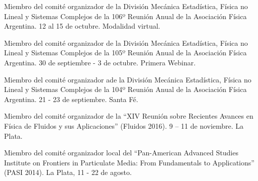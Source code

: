  Miembro del comité organizador de la División Mecánica Estadística, Física no Lineal y Sistemas Complejos de la 106º Reunión Anual de la Asociación Física Argentina. 12 al 15 de octubre. Modalidad virtual.

 Miembro del comité organizador de la División Mecánica Estadística, Física no Lineal y Sistemas Complejos de la 105º Reunión Anual de la Asociación Física Argentina. 30 de septiembre - 3 de octubre. Primera Webinar.

 Miembro del comité organizador ade la División Mecánica Estadística, Física no Lineal y Sistemas Complejos de la 104º Reunión Anual de la Asociación Física Argentina. 21 - 23 de septiembre. Santa Fé.

 Miembro del comité organizador de la ``XIV Reunión sobre Recientes Avances en Física de Fluidos y sus Aplicaciones'' (Fluidos 2016). 9 -- 11 de noviembre. La Plata.

 Miembro del comité organizador local del ``Pan-American Advanced Studies Institute on Frontiers in Particulate Media: From Fundamentals to Applications'' (PASI 2014). La Plata, 11 - 22 de agosto.
